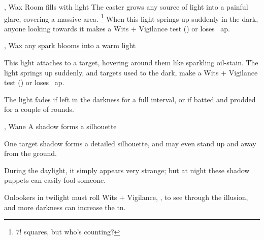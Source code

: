   {\mFire, \mAir}%
  {Wax}%
  {\duplicated}%
  {}%
  {Room fills with light}%
  {
    The caster grows any source of light into a painful glare, covering a massive area.%
    \footnote{$7!$ squares, but who's counting?}
    When this light springs up suddenly in the dark, anyone looking towards it makes a Wits + Vigilance test (\tn[9]) or loses ~\gls{ap}.
  }

  {\mFire, \mAir}%
  {Wax}%
  {\detailed}%
  {}%
  {any spark blooms into a warm light}%
  {
    This light attaches to a target, hovering around them like sparkling oil-stain.
    The light springs up suddenly, and targets used to the dark, make a Wits + Vigilance test (\tn[9]) or loses ~\gls{ap}.

    The light fades if left in the darkness for a full \gls{interval}, or if batted and prodded for a couple of rounds.
  }

  {\mFire, \mAir}%
  {Wane}%
  {\detailed}%
  {}%
  {A shadow forms a silhouette}%
  {
    One target shadow forms a detailed silhouette, and may even stand up and away from the ground.

    During the daylight, it simply appears very strange; but at night these shadow puppets can easily fool someone.

    \setcounter{track}{\value{spelllevel}}
    \addtocounter{track}{7}
    Onlookers in twilight must roll Wits + Vigilance, , to see through the illusion, and more darkness can increase the \gls{tn}.
  }

